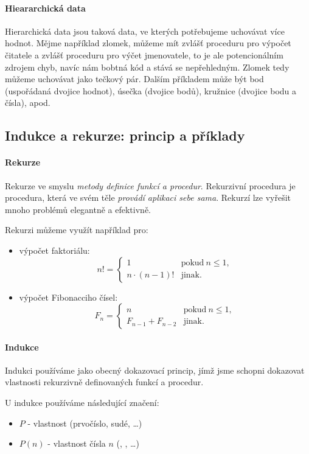 \documentclass[10pt,a4paper]{article}
\begin{document}
    \paragraph{Hieararchická data} Hierarchická data jsou taková data, ve kterých potřebujeme uchovávat více hodnot. Mějme například zlomek, můžeme mít zvlášť proceduru pro výpočet čitatele a zvlášť proceduru pro výčet jmenovatele, to je ale potencionálním zdrojem chyb, navíc nám bobtná kód a stává se nepřehledným. Zlomek tedy můžeme uchovávat jako tečkový pár. Dalším příkladem může být bod (uspořádaná dvojice hodnot), úsečka (dvojice bodů), kružnice (dvojice bodu a čísla), apod.
  \subsection{Indukce a rekurze: princip a příklady}
    \paragraph{Rekurze} Rekurze ve smyslu \textit{metody definice funkcí a procedur}.  Rekurzivní procedura je procedura, která ve svém těle \textit{provádí aplikaci sebe sama}. Rekurzí lze vyřešit mnoho problémů elegantně a efektivně.

    Rekurzi můžeme využít například pro:
    \begin{itemize}
      \item výpočet faktoriálu:
        $$
          n!=
          \begin{cases}
            1 & \text{pokud}\ n\leq 1,\\
            n \cdot (n-1)! & \text{jinak.}
          \end{cases}
        $$
      \item výpočet Fibonacciho čísel:
        $$
          F_n=
          \begin{cases}
            n & \text{pokud}\ n\leq 1,\\
            F_{n-1}+F_{n-2} & \text{jinak.}
          \end{cases}
        $$
    \end{itemize}

    \paragraph{Indukce} Indukci používáme jako obecný dokazovací princip, jímž jsme schopni dokazovat vlastnosti rekurzivně definovaných funkcí a procedur.

    U indukce používáme následující značení:
    \begin{itemize}
      \item $P$ - vlastnost (prvočíslo, sudé, \dots)
      \item $P(n)$ - vlastnost čísla $n$ (, , \dots)
    \end{itemize}
\end{document}
